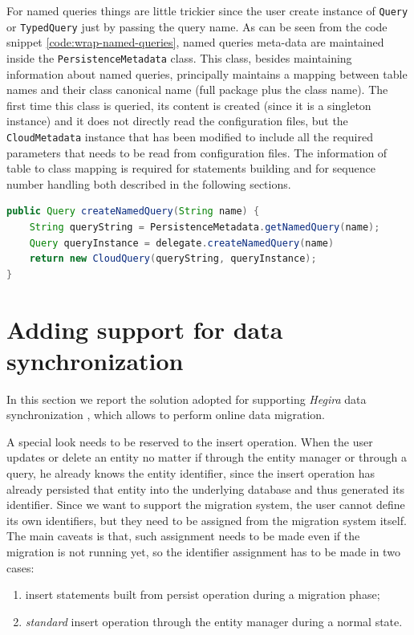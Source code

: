 \newparagraph For named queries things are little trickier since the user create instance of \texttt{Query} or \texttt{TypedQuery} just by passing the query name.
\noindent As can be seen from the code snippet \ref{code:wrap-named-queries}, named queries meta-data are maintained inside the \texttt{PersistenceMetadata} class. This class, besides maintaining information about named queries, principally maintains a mapping between table names and their class canonical name (full package plus the class name). The first time this class is queried, its content is created (since it is a singleton instance) and it does not directly read the  configuration files, but the \texttt{CloudMetadata} instance that has been modified to include all the required parameters that needs to be read from configuration files. 
The information of table to class mapping is required for statements building and for sequence number handling both described in the following sections.

\begin{lstlisting}[language=Java, caption=Wrap named queries, label=code:wrap-named-queries]
public Query createNamedQuery(String name) {
    String queryString = PersistenceMetadata.getNamedQuery(name);
    Query queryInstance = delegate.createNamedQuery(name)
    return new CloudQuery(queryString, queryInstance);
}
\end{lstlisting}

\section{Adding support for data synchronization}
\label{sec:sync}
In this section we report the solution adopted for supporting \textit{Hegira} data synchronization \cite{paper:modaclouds-deliverable}, which allows to perform online data migration.

\noindent A special look needs to be reserved to the insert operation. When the user updates or delete an entity no matter if through the entity manager or through a query, he already knows the entity identifier, since the insert operation has already persisted that entity into the underlying database and thus generated its identifier.
Since we want to support the migration system, the user cannot define its own identifiers, but they need to be assigned from the migration system itself.
The main caveats is that, such assignment needs to be made even if the migration is not running yet, so the identifier assignment has to be made in two cases:
\begin{enumerate}
\item insert statements built from persist operation during a migration phase;
\item \textit{standard} insert operation through the entity manager during a normal state.
\end{enumerate}


